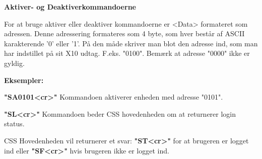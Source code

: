 \textbf{Aktiver- og Deaktiverkommandoerne}

For at bruge aktiver eller deaktiver kommandoerne er <Data> formateret som adressen. Denne adressering formateres som 4 byte, som hver består af ASCII karakterende '0' eller '1'. På den måde skriver man blot den adresse ind, som man har indstillet på sit X10 udtag. F.eks. "0100".
Bemærk at adresse "0000" ikke er gyldig.

\textbf{Eksempler:}

\textbf{"SA0101<cr>"}
Kommandoen aktiverer enheden med adresse "0101".

\textbf{"SL<cr>"}
Kommandoen beder CSS hovedenheden om at returnerer login status.

CSS Hovedenheden vil returnerer et svar:
\textbf{"ST<cr>"} for at brugeren er logget ind eller \textbf{"SF<cr>"} hvis brugeren ikke er logget ind.

